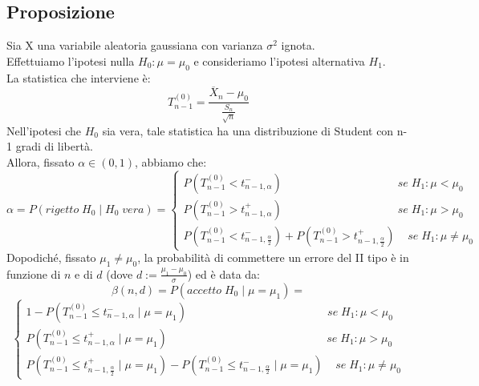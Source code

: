 \documentclass{article}
\begin{document}
\subsection*{Proposizione}
Sia X una variabile aleatoria gaussiana con varianza $\sigma^{2}$ ignota.\\
Effettuiamo l'ipotesi nulla $H_{0}: \mu = \mu_{0}$ e consideriamo l'ipotesi alternativa $H_{1}$.\\
La statistica che interviene è:
\[ T_{n-1}^{(0)} = \frac{\overline{X}_{n} - \mu_{0}}{\frac{S_{n}}{\sqrt{n}}} \]
Nell'ipotesi che $H_{0}$ sia vera, tale statistica ha una distribuzione di Student con n-1 gradi di libertà.\\
Allora, fissato $\alpha \in (0,1)$, abbiamo che:
\[ \alpha = P(rigetto \;  H_{0} \; | \; H_{0} \; vera) =
\begin{cases}
P(T_{n-1}^{(0)} < t_{n-1,\alpha}^{-}) \; \; \; \; \; \; \; \; \; \; \; \; \; \; \; \; \; \; \; \; \; \; \; \; \; \; \; \; \; \; \; \; \; \; \; \; \; se \; H_{1}: \mu < \mu_{0}\\
P(T_{n-1}^{(0)} > t_{n-1,\alpha}^{+}) \; \; \; \; \; \; \; \; \; \; \; \; \; \; \; \; \; \; \; \; \; \; \; \; \; \; \; \; \; \; \; \; \; \; \; \; \; se \; H_{1}: \mu > \mu_{0}\\
P(T_{n-1}^{(0)} < t_{n-1,\frac{\alpha}{2}}^{-}) + P(T_{n-1}^{(0)} > t_{n-1,\frac{\alpha}{2}}^{+}) \; \; \; \; se \; H_{1}: \mu \neq \mu_{0}
\end{cases}
\]
Dopodiché, fissato $\mu_{1} \neq \mu_{0}$, la probabilità di commettere un errore del II tipo è in funzione di $n$ e di $d$ (dove $d := \frac{\mu_{1}-\mu_{0}}{\sigma}$) ed è data da:
\[ \beta(n,d) = P(accetto \;  H_{0} \; | \; \mu = \mu_{1}) = \]
\[
\begin{cases}
1 - P(T_{n-1}^{(0)} \leq t_{n-1,\alpha}^{-} \; | \; \mu=\mu_{1}) \; \; \; \; \; \; \; \; \; \; \; \; \; \; \; \; \; \; \; \; \; \; \; \; \; \; \; \; \; \; \; \; \; \; \; \; \; \; \; \; \; \; \; \; \; se \; H_{1}: \mu < \mu_{0}\\
P(T_{n-1}^{(0)} \leq t_{n-1,\alpha}^{+} \; | \; \mu=\mu_{1}) \; \; \; \; \; \; \; \; \; \; \; \; \; \; \; \; \; \; \; \; \; \; \; \; \; \; \; \; \; \; \; \; \; \; \; \; \; \; \; \; \; \; \; \; \; \; \; \; \; \; \; se \; H_{1}: \mu > \mu_{0}\\
P(T_{n-1}^{(0)} \leq t_{n-1,\frac{\alpha}{2}}^{+} \; | \; \mu=\mu_{1}) - P(T_{n-1}^{(0)} \leq t_{n-1,\frac{\alpha}{2}}^{-} \; | \; \mu=\mu_{1}) \; \; \; \; se \; H_{1}: \mu \neq \mu_{0}
\end{cases}
\]
\end{document}

